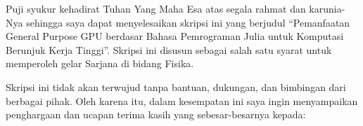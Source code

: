 \documentclass{skripsiactugm}
\begin{document}
\cover


\approvalpage \declarepage



\preface

Puji syukur kehadirat Tuhan Yang Maha Esa atas segala rahmat dan karunia-Nya sehingga saya dapat menyelesaikan skripsi ini yang berjudul “Pemanfaatan General Purpose GPU berdasar Bahasa Pemrograman Julia untuk Komputasi Berunjuk Kerja Tinggi”. Skripsi ini disusun sebagai salah satu syarat untuk memperoleh gelar Sarjana di bidang Fisika.

Skripsi ini tidak akan terwujud tanpa bantuan, dukungan, dan bimbingan dari berbagai pihak. Oleh karena itu, dalam kesempatan ini saya ingin menyampaikan penghargaan dan ucapan terima kasih yang sebesar-besarnya kepada:
\end{document}
